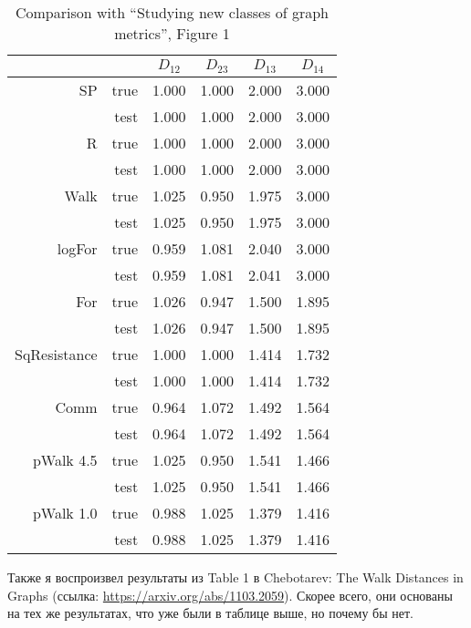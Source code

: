 \documentclass{article}
\begin{document}
\begin{table}[H]
\centering
\caption{Comparison with ``Studying new classes of graph metrics'', Figure 1}
\label{}
\begin{tabular}{rr|cccc}
             &      & $D_{12}$ & $D_{23}$ & $D_{13}$ & $D_{14}$ \\
             \hline
SP           & true & 1.000 & 1.000 & 2.000 & 3.000 \\
             & test & 1.000 & 1.000 & 2.000 & 3.000 \\
             \hline
R            & true & 1.000 & 1.000 & 2.000 & 3.000 \\
             & test & 1.000 & 1.000 & 2.000 & 3.000 \\
             \hline
Walk         & true & 1.025 & 0.950 & 1.975 & 3.000 \\
             & test & 1.025 & 0.950 & 1.975 & 3.000 \\
             \hline
logFor       & true & 0.959 & 1.081 & 2.040 & 3.000 \\
             & test & 0.959 & 1.081 & 2.041 & 3.000 \\
             \hline
For          & true & 1.026 & 0.947 & 1.500 & 1.895 \\
             & test & 1.026 & 0.947 & 1.500 & 1.895 \\
             \hline
SqResistance & true & 1.000 & 1.000 & 1.414 & 1.732 \\
             & test & 1.000 & 1.000 & 1.414 & 1.732 \\
             \hline
Comm         & true & 0.964 & 1.072 & 1.492 & 1.564 \\
             & test & 0.964 & 1.072 & 1.492 & 1.564 \\
             \hline
pWalk 4.5    & true & 1.025 & 0.950 & 1.541 & 1.466 \\
             & test & 1.025 & 0.950 & 1.541 & 1.466 \\
             \hline
pWalk 1.0    & true & 0.988 & 1.025 & 1.379 & 1.416 \\
             & test & 0.988 & 1.025 & 1.379 & 1.416
\end{tabular}
\end{table}

Также я воспроизвел результаты из Table 1 в Chebotarev: The Walk Distances in Graphs (ссылка: \url{https://arxiv.org/abs/1103.2059}). Скорее всего, они основаны на тех же результатах, что уже были в таблице выше, но почему бы нет.
\end{document}
